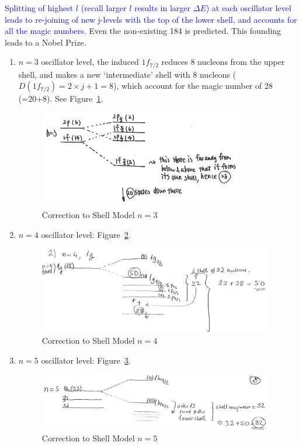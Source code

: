 \documentclass{school-22.101-notes}
\begin{document}
\textcolor{blue}{Splitting of highest $l$ (recall larger $l$ results in larger $\Delta E$) at each oscillator level leads to re-joining of new j-levels with the top of the lower shell, and accounts for all the magic numbers.} Even the non-existing 184 is predicted. This founding leads to a Nobel Prize. 
\begin{enumerate}
\item $n=3$ oscillator level, the induced $1f_{7/2}$ reduces 8 nucleons from the upper shell, and makes a new `intermediate' shell with 8 nucleons ($D(1f_{7/2}) = 2\times j + 1 = 8$), which account for the magic number of 28 (=20+8). See Figure~\ref{shell-28}.
\begin{figure}
    \centering
    \includegraphics[width=3.5in]{images/shell/magic-number-28.png}
    \caption{Correction to Shell Model $n=3$\label{shell-28}}
\end{figure}

\item $n=4$ oscillator level: Figure~\ref{shell-50}.
\begin{figure}
    \centering
    \includegraphics[width=4in]{images/shell/magic-number-50.png}
    \caption{Correction to Shell Model $n=4$\label{shell-50}}
\end{figure}

\item $n=5$ oscillator level: Figure~\ref{shell-82}.
\begin{figure}
    \centering
    \includegraphics[width=4in]{images/shell/magic-number-82.png}
    \caption{Correction to Shell Model $n=5$\label{shell-82}}
\end{figure}


\end{enumerate}
\end{document}

